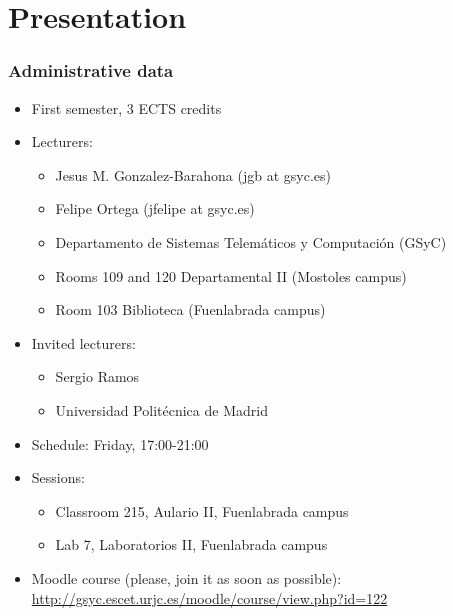 
\section{Presentation}


\begin{frame}
\frametitle{Administrative data}

\begin{itemize}
\item First semester, 3 ECTS credits
\item Lecturers:
  \begin{itemize}
  \item Jesus M. Gonzalez-Barahona (jgb at gsyc.es)
  \item Felipe Ortega (jfelipe at gsyc.es)
  \item Departamento de Sistemas Telemáticos y Computación (GSyC)
  \item Rooms 109 and 120 Departamental II (Mostoles campus)
  \item Room 103 Biblioteca (Fuenlabrada campus)
  \end{itemize}
\item Invited lecturers:
  \begin{itemize}
  \item Sergio Ramos
  \item Universidad Politécnica de Madrid
  \end{itemize}
\item Schedule: Friday, 17:00-21:00
\item Sessions:
  \begin{itemize}
  \item Classroom 215, Aulario II, Fuenlabrada campus
  \item Lab 7, Laboratorios II, Fuenlabrada campus
  \end{itemize}
\item Moodle course (please, join it as soon as possible): \\
  {\footnotesize \url{http://gsyc.escet.urjc.es/moodle/course/view.php?id=122}}
\end{itemize}
\end{frame}

